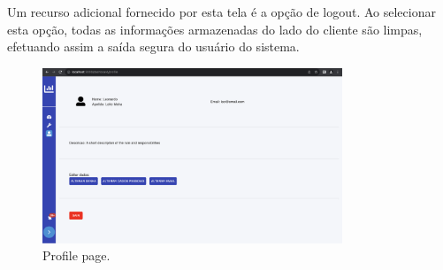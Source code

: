 Um recurso adicional fornecido por esta tela é a opção de logout. Ao selecionar esta opção, todas as informações armazenadas do lado do cliente são limpas, efetuando assim a saída segura do usuário do sistema.

\begin{figure}[htbp]
	\centering
	\includegraphics[width=0.8\textwidth]{images/profile.png}
	\caption{Profile page.}
	\label{fig:profilePage}
\end{figure}

